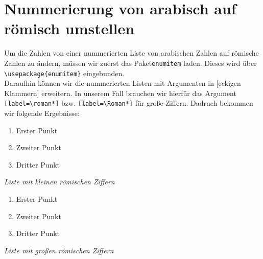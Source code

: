 \documentclass[
12pt,
ngerman
]{scrreprt}
\begin{document}
\section{Nummerierung von arabisch auf römisch umstellen}
Um die Zahlen von einer nummerierten Liste von arabischen Zahlen auf römische Zahlen zu ändern, müssen wir zuerst das Paket\verb!enumitem! laden. Dieses wird über \verb!\usepackage{enumitem}! eingebunden. \\
Daraufhin können wir die nummerierten Listen mit Argumenten in [eckigen Klammern] erweitern. In unserem Fall brauchen wir hierfür das Argument \verb![label=\roman*]! bzw. \verb![label=\Roman*]! für große Ziffern. Dadruch bekommen wir folgende Ergebnisse:
  \begin{multicols}{2}
    \begin{enumerate}[label=\roman*]
      \item Erster Punkt
      \item Zweiter Punkt
      \item Dritter Punkt
    \end{enumerate}
    \emph{Liste mit kleinen römischen Ziffern}
    \begin{enumerate}[label=\Roman*]
      \item Erster Punkt
      \item Zweiter Punkt
      \item Dritter Punkt
    \end{enumerate}
    \emph{Liste mit großen römischen Ziffern}
  \end{multicols}
\end{document}
